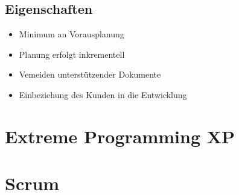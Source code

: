 \documentclass[a4paper]{article}
\theoremstyle{break}
\begin{document}
        \subsection{Eigenschaften}
        \begin{itemize}
            \item Minimum an Vorausplanung
            \item Planung erfolgt inkrementell
            \item Vemeiden unterstützender Dokumente
            \item Einbeziehung des Kunden in die Entwicklung
        \end{itemize}
        
          
    \section{Extreme Programming XP}

    \section{Scrum}
\end{document}
